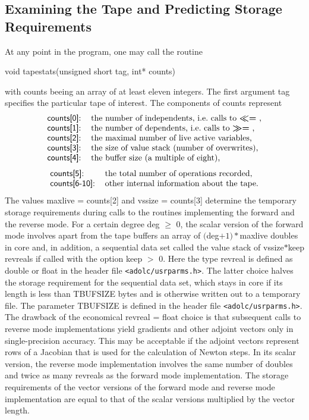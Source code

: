 \documentclass[11pt,twoside]{article}
\begin{document}
\subsection{Examining the Tape and Predicting Storage Requirements }
\label{examiningTape}
%
At any point in the program, one may call the routine
\begin{center}
{\sf void tapestats(unsigned short tag, int* counts)}
\end{center}
with {\sf counts} beeing an array of at least eleven integers.
The first argument {\sf tag} specifies the particular tape of
interest. The components of {\sf counts} represent
\[
\begin{tabular}{ll}
{\sf counts[0]}: & the number of independents, i.e.~calls to \boldmath $\ll=$ \unboldmath, \\
{\sf counts[1]}: & the number of dependents, i.e.~calls to \boldmath $\gg=$ \unboldmath,\\ 
{\sf counts[2]}: & the maximal number of live active variables,\\
{\sf counts[3]}: & the size of value stack (number of overwrites),\\
{\sf counts[4]}: & the buffer size (a multiple of eight),
\end{tabular}
\]
\[
\begin{tabular}{ll}
{\sf counts[5]}: & the total number of operations recorded,\\
{\sf counts[6-10]}: & other internal information about the tape.
\end{tabular}
\]
The values {\sf maxlive} = {\sf counts[2]} and {\sf vssize} = {\sf counts[3]} 
determine the temporary 
storage requirements during calls to the routines
implementing the forward and the reverse mode.
For a certain degree {\sf deg} $\geq$ 0, the scalar version of the
forward mode involves apart from the tape buffers an array of 
 $(${\sf deg}$+1)*${\sf maxlive} {\sf double}s in
core and, in addition, a sequential data set called the value stack 
of {\sf vssize}$*${\sf keep} {\sf revreal}s if called with the 
option {\sf keep} $>$ 0. Here
the type {\sf revreal} is defined as {\sf double} or {\sf float} in
the header file \verb=<adolc/usrparms.h>=. The latter choice halves the storage
requirement for the sequential data set, which stays in core if
its length is less than {\sf TBUFSIZE} bytes and is otherwise written
out to a temporary file. The parameter {\sf TBUFSIZE} is defined in the header file \verb=<adolc/usrparms.h>=.
The drawback of the economical 
{\sf revreal} = {\sf float} choice is that subsequent calls to reverse mode implementations
yield gradients and other adjoint vectors only in single-precision
accuracy. This may be acceptable if the adjoint vectors
represent rows of a Jacobian that is  used for the calculation of
Newton steps. In its scalar version, the reverse mode implementation involves 
the same number of {\sf double}s and twice as many {\sf revreal}s as the
forward mode implementation.
The storage requirements of the vector versions of the forward mode and
reverse mode implementation are equal to that of the scalar versions multiplied by
the vector length.
%
\end{document}

